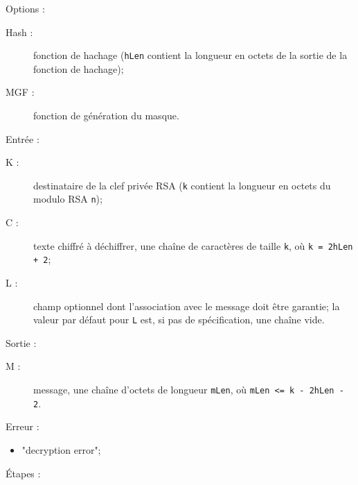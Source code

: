 Options :
\begin{description}
\item [Hash :] fonction de hachage (\texttt{hLen} contient la longueur en octets de la sortie de la fonction de hachage);
    \item [MGF :] fonction de génération du masque.\\
\end{description}
Entrée :
\begin{description}
    \item [K :] destinataire de la clef privée RSA (\texttt{k} contient la longueur en octets du modulo RSA \texttt{n});
    \item [C :] texte chiffré à déchiffrer, une chaîne de caractères de taille \texttt{k}, où \texttt{k = 2hLen + 2};
    \item [L :] champ optionnel dont l'association avec le message doit être garantie; la valeur par défaut pour \texttt{L} est, si pas de spécification, une chaîne vide.\\
\end{description}
Sortie :
\begin{description}
    \item [M :] message, une chaîne d'octets de longueur \texttt{mLen}, où \texttt{mLen <= k - 2hLen - 2}.\\
\end{description}
Erreur :
\begin{itemize}
\item "decryption error";
\end{itemize}
Étapes :
